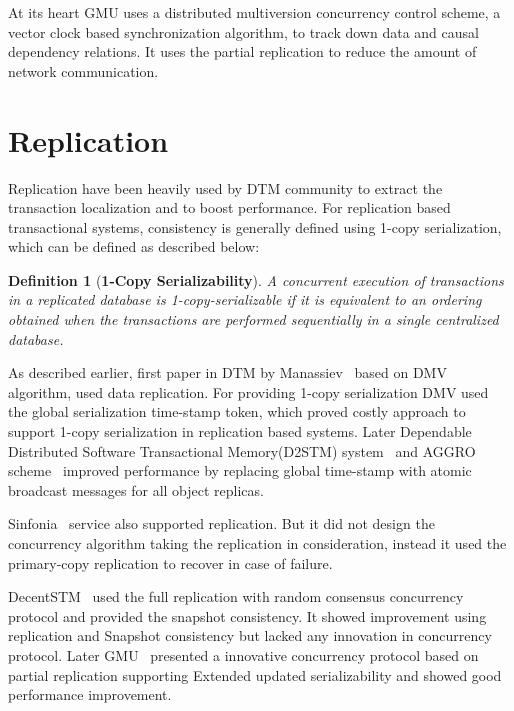 \documentclass[12pt,english]{report}
\newtheorem{definition}{Definition}[section]
\begin{document}
At its heart GMU uses a distributed multiversion concurrency control scheme, a vector clock based synchronization algorithm, to track down data and causal dependency relations. It uses the partial replication to reduce the amount of network communication. 

\section{Replication}
Replication have been heavily used by DTM community to extract the transaction localization and to boost performance. For replication based transactional systems, consistency is generally defined using 1-copy serialization, which can be defined as described below:

\begin{definition}[\textbf{1-Copy Serializability}]
A concurrent execution of transactions in a replicated database is 1-copy-serializable if it is equivalent  to an ordering obtained when the transactions are performed sequentially in a single centralized database.~\cite{bornea2011one}
\end{definition}

As described earlier, first paper in DTM by Manassiev~\cite{Manassiev:2006:EDV:1122971.1123002} based on DMV algorithm, used data replication. For providing 1-copy serialization DMV used the global serialization time-stamp token, which proved costly approach to support 1-copy serialization in replication based systems. Later Dependable Distributed Software Transactional Memory(D2STM) system~\cite{D2STM:5368778} and AGGRO scheme~\cite{AGGRO:5598236} improved performance by replacing global time-stamp with atomic broadcast messages for all object replicas.  

Sinfonia~\cite{Aguilera:2009:SNP:1629087.1629088} service also supported replication. But it did not design the concurrency algorithm taking the replication in consideration, instead it used the primary-copy replication to recover in case of failure. 

DecentSTM~\cite{DecentSTM:5470446} used the full replication with random consensus concurrency protocol and provided the  snapshot consistency. It showed improvement using replication and Snapshot consistency but lacked any innovation in concurrency protocol. Later GMU~\cite{GMU:peluso2012scalability} presented a innovative concurrency protocol based on partial replication supporting Extended updated serializability and showed good performance improvement. 
\end{document}
